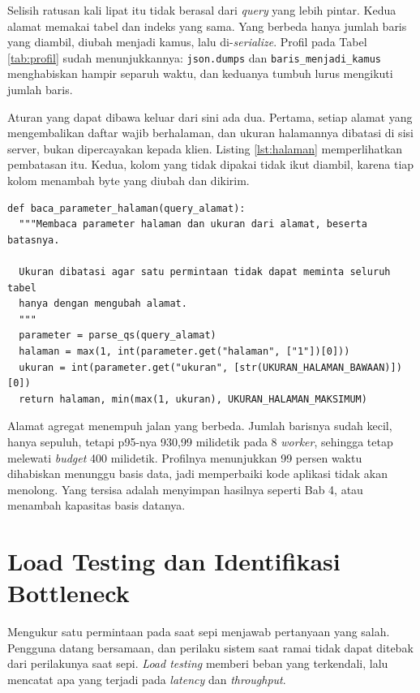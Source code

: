 Selisih ratusan kali lipat itu tidak berasal dari \textit{query} yang lebih pintar.
Kedua alamat memakai tabel dan indeks yang sama. Yang berbeda hanya jumlah
baris yang diambil, diubah menjadi kamus, lalu di-\textit{serialize}. Profil
pada Tabel \ref{tab:profil} sudah menunjukkannya: \texttt{json.dumps} dan
\texttt{baris\_menjadi\_kamus} menghabiskan hampir separuh waktu, dan keduanya
tumbuh lurus mengikuti jumlah baris.

Aturan yang dapat dibawa keluar dari sini ada dua. Pertama, setiap alamat
yang mengembalikan daftar wajib berhalaman, dan ukuran halamannya dibatasi di
sisi server, bukan dipercayakan kepada klien. Listing
\ref{lst:halaman} memperlihatkan pembatasan itu. Kedua, kolom yang tidak
dipakai tidak ikut diambil, karena tiap kolom menambah byte yang diubah dan
dikirim.

\begin{lstlisting}[style=PythonStyle, caption={Batas ukuran halaman ditegakkan di sisi server, tersedia di \berkas{sources/chapter05/aplikasi.py}}, label={lst:halaman}]
def baca_parameter_halaman(query_alamat):
  """Membaca parameter halaman dan ukuran dari alamat, beserta batasnya.

  Ukuran dibatasi agar satu permintaan tidak dapat meminta seluruh tabel
  hanya dengan mengubah alamat.
  """
  parameter = parse_qs(query_alamat)
  halaman = max(1, int(parameter.get("halaman", ["1"])[0]))
  ukuran = int(parameter.get("ukuran", [str(UKURAN_HALAMAN_BAWAAN)])[0])
  return halaman, min(max(1, ukuran), UKURAN_HALAMAN_MAKSIMUM)
\end{lstlisting}

Alamat agregat menempuh jalan yang berbeda. Jumlah barisnya sudah kecil,
hanya sepuluh, tetapi p95-nya 930,99 milidetik pada 8 \textit{worker},
sehingga tetap melewati \textit{budget} 400 milidetik. Profilnya menunjukkan 99
persen waktu dihabiskan menunggu basis data, jadi memperbaiki kode aplikasi
tidak akan menolong. Yang tersisa adalah menyimpan hasilnya seperti Bab 4,
atau menambah kapasitas basis datanya.

\section{Load Testing dan Identifikasi Bottleneck}

Mengukur satu permintaan pada saat sepi menjawab pertanyaan yang salah.
Pengguna datang bersamaan, dan perilaku sistem saat ramai tidak dapat
ditebak dari perilakunya saat sepi. \textit{Load testing} memberi beban yang
terkendali, lalu mencatat apa yang terjadi pada \textit{latency} dan
\textit{throughput}.

